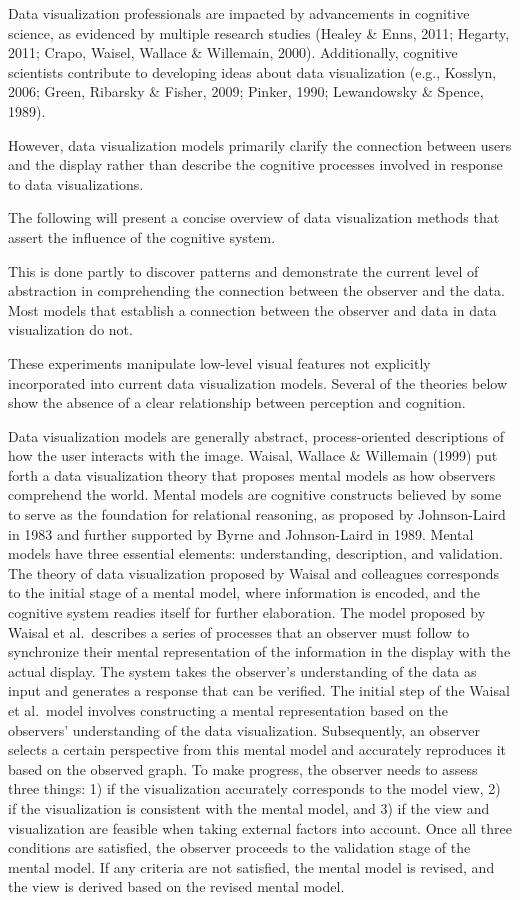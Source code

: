 \documentclass[print]{nuthesis}
\begin{document}
Data visualization professionals are impacted by advancements in cognitive science, as evidenced by multiple research studies (Healey \& Enns, 2011; Hegarty, 2011; Crapo, Waisel, Wallace \& Willemain, 2000). Additionally, cognitive scientists contribute to developing ideas about data visualization (e.g., Kosslyn, 2006; Green, Ribarsky \& Fisher, 2009; Pinker, 1990; Lewandowsky \& Spence, 1989).

However, data visualization models primarily clarify the connection between users and the display rather than describe the cognitive processes involved in response to data visualizations.

The following will present a concise overview of data visualization methods that assert the influence of the cognitive system.

This is done partly to discover patterns and demonstrate the current level of abstraction in comprehending the connection between the observer and the data. Most models that establish a connection between the observer and data in data visualization do not.

These experiments manipulate low-level visual features not explicitly incorporated into current data visualization models. Several of the theories below show the absence of a clear relationship between perception and cognition.

Data visualization models are generally abstract, process-oriented descriptions of how the user interacts with the image.
Waisal, Wallace \& Willemain (1999) put forth a data visualization theory that proposes mental models as how observers comprehend the world.
Mental models are cognitive constructs believed by some to serve as the foundation for relational reasoning, as proposed by Johnson-Laird in 1983 and further supported by Byrne and Johnson-Laird in 1989. Mental models have three essential elements: understanding, description, and validation.
The theory of data visualization proposed by Waisal and colleagues corresponds to the initial stage of a mental model, where information is encoded, and the cognitive system readies itself for further elaboration.
The model proposed by Waisal et al.~describes a series of processes that an observer must follow to synchronize their mental representation of the information in the display with the actual display.
The system takes the observer's understanding of the data as input and generates a response that can be verified.
The initial step of the Waisal et al.~model involves constructing a mental representation based on the observers' understanding of the data visualization.
Subsequently, an observer selects a certain perspective from this mental model and accurately reproduces it based on the observed graph.
To make progress, the observer needs to assess three things: 1) if the visualization accurately corresponds to the model view, 2) if the visualization is consistent with the mental model, and 3) if the view and visualization are feasible when taking external factors into account.
Once all three conditions are satisfied, the observer proceeds to the validation stage of the mental model.
If any criteria are not satisfied, the mental model is revised, and the view is derived based on the revised mental model.
\end{document}
